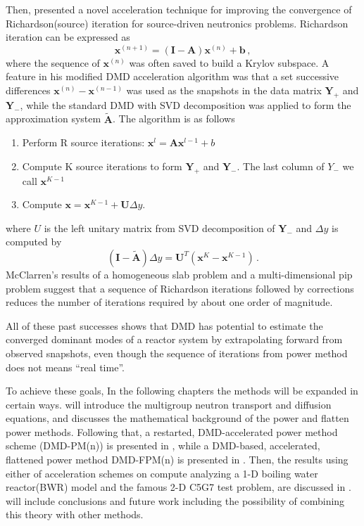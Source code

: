 Then, \citet{mcclarren_acceleration_2018} presented a novel acceleration technique for improving the convergence of Richardson(source) iteration for source-driven neutronics problems.
Richardson iteration can be expressed as 
\begin{equation}
 \mathbf{x}^{(n+1)} = (\mathbf{I}-\mathbf{A})\mathbf{x}^{(n)} + \mathbf{b} \, ,
 \label{eq:richardson}
\end{equation}
where the sequence of $\mathbf{x}^{(n)}$ was often saved to build a Krylov subspace. 
A feature in his modified DMD acceleration algorithm was that a set successive differences $\mathbf{x}^{(n)}-\mathbf{x}^{(n-1)}$ was used as the snapshots in the data matrix $\mathbf{Y}_+$ and $\mathbf{Y}_-$, while the standard DMD with SVD decomposition was applied to form the approximation system $\mathbf{\tilde{A}}$.
The algorithm is as follows
\begin{enumerate}
 \item Perform R source iterations: $\mathbf{x}^{l} = \mathbf{A} \mathbf{x}^{l-1} +b$
 \item Compute K source iterations to form $\mathbf{Y}_+$ and $\mathbf{Y}_-$. The last column of $Y_-$ we call $\mathbf{x}^{K-1}$ 
 \item Compute $\mathbf{x} = \mathbf{x}^{K-1} + \mathbf{U} \Delta y$.
\end{enumerate} 
where $U$ is the left unitary matrix from SVD decomposition of $\mathbf{Y}_-$ and $\Delta y$ is computed by 
\begin{equation}
 (\mathbf{I} - \mathbf{\tilde{A}}) \Delta y = \mathbf{U}^T(\mathbf{x}^{K} - \mathbf{x}^{K-1})\, .
 \label{eq:McClarren}
\end{equation}
McClarren's results of a homogeneous slab problem and a multi-dimensional pip problem suggest that a sequence of Richardson iterations followed by corrections reduces the number of iterations required by about one order of magnitude.

All of these past successes shows that DMD has potential to estimate the converged dominant modes of a reactor system by extrapolating forward from observed snapshots, even though the sequence of iterations from power method does not means ``real time''.

To achieve these goals, In the following chapters the methods will be expanded in certain ways.
 will introduce the multigroup neutron transport and diffusion equations, and  discusses the mathematical background of the power and flatten power methods.
Following that, a restarted, DMD-accelerated power method scheme (DMD-PM(n)) is presented in , while a DMD-based, accelerated, flattened power
method DMD-FPM(n) is presented in .
Then, the results using either of acceleration schemes on compute analyzing a 1-D boiling water reactor(BWR) model and the famous 2-D C5G7 test problem, are discussed in .
 will include conclusions and future work including the possibility of combining this theory with other methods. 

